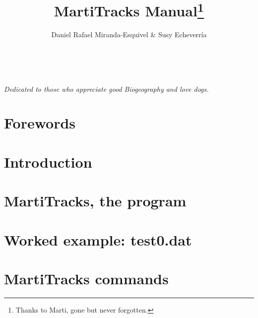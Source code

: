 \documentclass[nols]{tufte-book}%
\title{{M}arti{T}racks Manual\thanks{Thanks to Marti, gone but never forgotten.}}
\author[Daniel Rafael Miranda-Esquivel \& Susy Echeverr\'ia]{Daniel Rafael Miranda-Esquivel \& Susy Echeverr\'ia}
\begin{document}
% 
% 


% 
% 
\frontmatter




\maketitle




\vfill
{}

\tableofcontents

\listoffigures

\listoftables

\cleardoublepage
~\vfill
\begin{doublespace}
\noindent\fontsize{18}{22}\selectfont\itshape
\nohyphenation
Dedicated to those who appreciate good Biogeography and love dogs.
\end{doublespace}

\chapter{Forewords}



\mainmatter


\chapter{Introduction}
\label{ch:panbio}





\chapter{MartiTracks, the program}


  


\chapter{Worked example: test0.dat}





 

\chapter{MartiTracks commands}







\backmatter




\printindex
\end{document}
